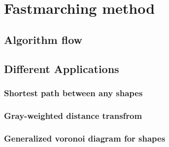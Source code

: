 \chapter{Fastmarching method} \label{chpt:fm}
\section{Algorithm flow}
\section{Different Applications}
\subsection{Shortest path between any shapes}
\subsection{Gray-weighted distance transfrom}
\subsection{Generalized voronoi diagram for shapes} \label{subsec:gvd}
